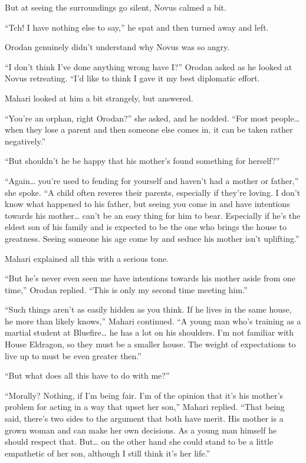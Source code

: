 \documentclass[a4paper,10pt]{book}
\begin{document}
But at seeing the surroundings go silent, Novus calmed a bit.\par
“Tch! I have nothing else to say,” he spat and then turned away and left.\par
Orodan genuinely didn’t understand why Novus was so angry.\par
“I don’t think I’ve done anything wrong have I?” Orodan asked as he looked at Novus retreating. “I’d like to think I gave it my best diplomatic effort.\par
Mahari looked at him a bit strangely, but answered.\par
“You’re an orphan, right Orodan?” she asked, and he nodded. “For most people… when they lose a parent and then someone else comes in, it can be taken rather negatively.”\par
“But shouldn’t he be happy that his mother’s found something for herself?”\par
“Again… you’re used to fending for yourself and haven’t had a mother or father,” she spoke. “A child often reveres their parents, especially if they’re loving. I don’t know what happened to his father, but seeing you come in and have intentions towards his mother… can’t be an easy thing for him to bear. Especially if he’s the eldest son of his family and is expected to be the one who brings the house to greatness. Seeing someone his age come by and seduce his mother isn’t uplifting.”\par
Mahari explained all this with a serious tone.\par
“But he’s never even seen me have intentions towards his mother aside from one time,” Orodan replied. “This is only my second time meeting him.”\par
“Such things aren’t as easily hidden as you think. If he lives in the same house, he more than likely knows,” Mahari continued. “A young man who’s training as a martial student at Bluefire… he has a lot on his shoulders. I’m not familiar with House Eldragon, so they must be a smaller house. The weight of expectations to live up to must be even greater then.”\par
“But what does all this have to do with me?”\par
“Morally? Nothing, if I’m being fair. I’m of the opinion that it’s his mother’s problem for acting in a way that upset her son,” Mahari replied. “That being said, there’s two sides to the argument that both have merit. His mother is a grown woman and can make her own decisions. As a young man himself he should respect that. But… on the other hand she could stand to be a little empathetic of her son, although I still think it’s her life.”\par
\end{document}
